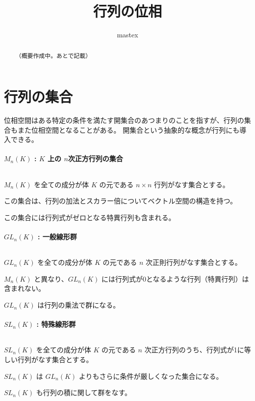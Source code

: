 \documentclass[uplatex,a4j,12pt,dvipdfmx]{jsarticle}
\title{
行列の位相
}
\author{
mastex
}
\begin{document}
\maketitle


\begin{abstract}
	（概要作成中。あとで記載）
\end{abstract}

\section{行列の集合}

位相空間はある特定の条件を満たす開集合のあつまりのことを指すが、行列の集合もまた位相空間となることがある。
開集合という抽象的な概念が行列にも導入できる。

\paragraph{$M_{n}(K)$ : $K$ 上の $n$次正方行列の集合}

${}$

$M_{n}(K)$ を全ての成分が体 $K$ の元である $n \times n$ 行列がなす集合とする。

この集合は、行列の加法とスカラー倍についてベクトル空間の構造を持つ。

この集合には行列式がゼロとなる特異行列も含まれる。

\paragraph{$GL_{n}(K)$ : 一般線形群}

${}$

$GL_{n}(K)$ を全ての成分が体 $K$ の元である $n$ 次正則行列がなす集合とする。

$M_{n}(K)$ と異なり、$GL_{n}(K)$ には行列式が0となるような行列（特異行列）は含まれない。

$GL_{n}(K)$ は行列の乗法で群になる。

\paragraph{$SL_{n}(K)$ : 特殊線形群}

${}$

$SL_{n}(K)$ を全ての成分が体 $K$ の元である $n$ 次正方行列のうち、行列式が1に等しい行列がなす集合とする。

$SL_{n}(K)$ は $GL_{n}(K)$ よりもさらに条件が厳しくなった集合になる。

$SL_{n}(K)$ も行列の積に関して群をなす。
\end{document}
